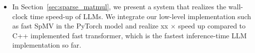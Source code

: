 \begin{itemize}
    
    \item In Section~\ref{sec:sparse_matmul}, we present a system that realizes the wall-clock time speed-up of LLMs. We integrate our low-level implementation such as fast SpMV in the PyTorch model and realize xx $\times$ speed up compared to C++ implemented fast transformer, which is the fastest inference-time LLM implementation so far.
\end{itemize}
\fi



